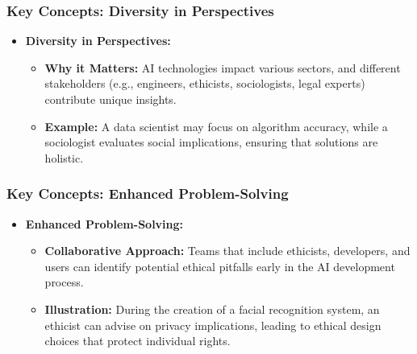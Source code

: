 \documentclass[aspectratio=169]{beamer}
\begin{document}
\begin{frame}[fragile]
    \frametitle{Key Concepts: Diversity in Perspectives}
    \begin{itemize}
        \item \textbf{Diversity in Perspectives:}
        \begin{itemize}
            \item \textbf{Why it Matters:} AI technologies impact various sectors, and different stakeholders (e.g., engineers, ethicists, sociologists, legal experts) contribute unique insights.
            \item \textbf{Example:} A data scientist may focus on algorithm accuracy, while a sociologist evaluates social implications, ensuring that solutions are holistic.
        \end{itemize}
    \end{itemize}
\end{frame}

\begin{frame}[fragile]
    \frametitle{Key Concepts: Enhanced Problem-Solving}
    \begin{itemize}
        \item \textbf{Enhanced Problem-Solving:}
        \begin{itemize}
            \item \textbf{Collaborative Approach:} Teams that include ethicists, developers, and users can identify potential ethical pitfalls early in the AI development process.
            \item \textbf{Illustration:} During the creation of a facial recognition system, an ethicist can advise on privacy implications, leading to ethical design choices that protect individual rights.
        \end{itemize}
    \end{itemize}
\end{frame}
\end{document}
